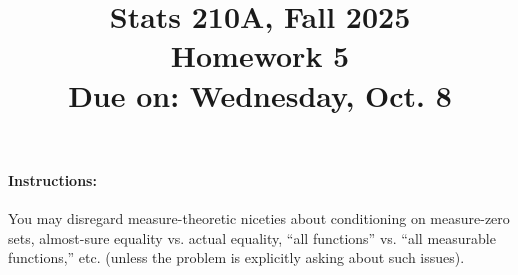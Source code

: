 \documentclass{article}
\theoremstyle{definition}
\begin{document}
\title{Stats 210A, Fall 2025\\
  Homework 5 \\
  {\large {\bf Due on}: Wednesday, Oct. 8}}
\date{}

\maketitle

\paragraph{Instructions:} You may disregard measure-theoretic niceties about conditioning on measure-zero sets, almost-sure equality vs. actual equality, ``all functions'' vs. ``all measurable functions,'' etc. (unless the problem is explicitly asking about such issues).
\end{document}

